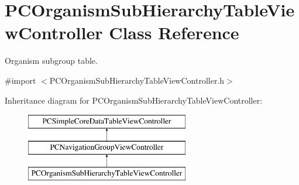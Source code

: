 \hypertarget{interface_p_c_organism_sub_hierarchy_table_view_controller}{
\section{PCOrganismSubHierarchyTableViewController Class Reference}
\label{interface_p_c_organism_sub_hierarchy_table_view_controller}
}


Organism subgroup table.  




{\ttfamily \#import $<$PCOrganismSubHierarchyTableViewController.h$>$}

Inheritance diagram for PCOrganismSubHierarchyTableViewController:\begin{figure}[h!]
\begin{center}
\leavevmode
\includegraphics[height=3.000000cm]{kegg_doc/interface_p_c_organism_sub_hierarchy_table_view_controller}
\end{center}
\end{figure}
